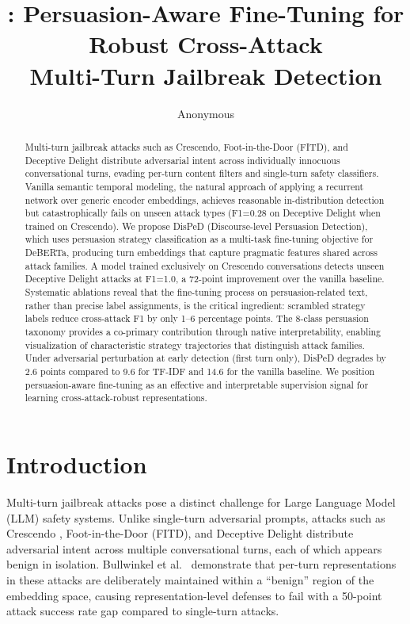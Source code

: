 \documentclass[11pt,a4paper]{article}
\title{\ours{}: Persuasion-Aware Fine-Tuning for Robust Cross-Attack\\Multi-Turn Jailbreak Detection}
\author{Anonymous}
\newcommand{\ours}{DisPeD}
\begin{document}
\maketitle

\begin{abstract}
Multi-turn jailbreak attacks such as Crescendo, Foot-in-the-Door (FITD), and Deceptive Delight distribute adversarial intent across individually innocuous conversational turns, evading per-turn content filters and single-turn safety classifiers. Vanilla semantic temporal modeling, the natural approach of applying a recurrent network over generic encoder embeddings, achieves reasonable in-distribution detection but catastrophically fails on unseen attack types (F1=0.28 on Deceptive Delight when trained on Crescendo). We propose \ours{} (Discourse-level Persuasion Detection), which uses persuasion strategy classification as a multi-task fine-tuning objective for DeBERTa, producing turn embeddings that capture pragmatic features shared across attack families. A model trained exclusively on Crescendo conversations detects unseen Deceptive Delight attacks at F1=1.0, a 72-point improvement over the vanilla baseline. Systematic ablations reveal that the fine-tuning process on persuasion-related text, rather than precise label assignments, is the critical ingredient: scrambled strategy labels reduce cross-attack F1 by only 1--6 percentage points. The 8-class persuasion taxonomy provides a co-primary contribution through native interpretability, enabling visualization of characteristic strategy trajectories that distinguish attack families. Under adversarial perturbation at early detection (first turn only), \ours{} degrades by 2.6 points compared to 9.6 for TF-IDF and 14.6 for the vanilla baseline. We position persuasion-aware fine-tuning as an effective and interpretable supervision signal for learning cross-attack-robust representations.
\end{abstract}

\section{Introduction}

Multi-turn jailbreak attacks pose a distinct challenge for Large Language Model (LLM) safety systems. Unlike single-turn adversarial prompts, attacks such as Crescendo \cite{russinovich2024}, Foot-in-the-Door (FITD), and Deceptive Delight \cite{decdelight2024} distribute adversarial intent across multiple conversational turns, each of which appears benign in isolation. Bullwinkel et al.~\cite{bullwinkel2025} demonstrate that per-turn representations in these attacks are deliberately maintained within a ``benign'' region of the embedding space, causing representation-level defenses to fail with a 50-point attack success rate gap compared to single-turn attacks.
\end{document}
